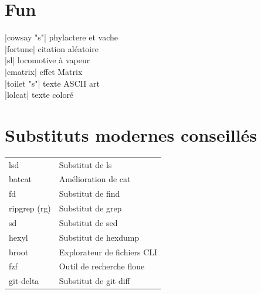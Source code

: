 \documentclass[9pt]{extarticle}
\newenvironment{cmdblock}{%
  \par\setlength{\parindent}{0pt}\setlength{\parskip}{0pt}%
}{\par}
\begin{document}
\begin{multicols}{4}
\section*{Fun}

\begin{cmdblock}
\code|cowsay "s"| \quad phylactere et vache \\
\code|fortune| \quad citation aléatoire  \\
\code|sl| \quad locomotive à vapeur  \\
\code|cmatrix| \quad effet Matrix  \\
\code|toilet "s"| \quad texte ASCII art  \\
\code|lolcat| \quad texte coloré  \\
\end{cmdblock}

\section*{Substituts modernes conseillés}

\begin{tabularx}{\columnwidth}{lX}
lsd & Substitut de ls  \\
batcat& Amélioration de cat  \\
fd & Substitut de find  \\
ripgrep (rg) & Substitut de grep  \\
sd & Substitut de sed  \\
hexyl & Substitut de hexdump  \\
broot & Explorateur de fichiers CLI  \\
fzf & Outil de recherche floue  \\
git-delta & Substitut de git diff \\
\end{tabularx}

\end{multicols}
\end{document}
